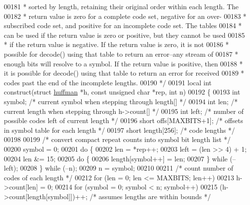 \begin{DoxyCode}
00181 \textcolor{comment}{ * sorted by length, retaining their original order within each length.  The}
00182 \textcolor{comment}{ * return value is zero for a complete code set, negative for an over-}
00183 \textcolor{comment}{ * subscribed code set, and positive for an incomplete code set.  The tables}
00184 \textcolor{comment}{ * can be used if the return value is zero or positive, but they cannot be used}
00185 \textcolor{comment}{ * if the return value is negative.  If the return value is zero, it is not}
00186 \textcolor{comment}{ * possible for decode() using that table to return an error--any stream of}
00187 \textcolor{comment}{ * enough bits will resolve to a symbol.  If the return value is positive, then}
00188 \textcolor{comment}{ * it is possible for decode() using that table to return an error for received}
00189 \textcolor{comment}{ * codes past the end of the incomplete lengths.}
00190 \textcolor{comment}{ */}
00191 local \textcolor{keywordtype}{int} construct(\textcolor{keyword}{struct} \hyperlink{structhuffman}{huffman} *h, \textcolor{keyword}{const} \textcolor{keywordtype}{unsigned} \textcolor{keywordtype}{char} *rep, \textcolor{keywordtype}{int} n)
00192 \{
00193     \textcolor{keywordtype}{int} symbol;         \textcolor{comment}{/* current symbol when stepping through length[] */}
00194     \textcolor{keywordtype}{int} len;            \textcolor{comment}{/* current length when stepping through h->count[] */}
00195     \textcolor{keywordtype}{int} left;           \textcolor{comment}{/* number of possible codes left of current length */}
00196     \textcolor{keywordtype}{short} offs[MAXBITS+1];      \textcolor{comment}{/* offsets in symbol table for each length */}
00197     \textcolor{keywordtype}{short} length[256];  \textcolor{comment}{/* code lengths */}
00198 
00199     \textcolor{comment}{/* convert compact repeat counts into symbol bit length list */}
00200     symbol = 0;
00201     \textcolor{keywordflow}{do} \{
00202         len = *rep++;
00203         left = (len >> 4) + 1;
00204         len &= 15;
00205         \textcolor{keywordflow}{do} \{
00206             length[symbol++] = len;
00207         \} \textcolor{keywordflow}{while} (--left);
00208     \} \textcolor{keywordflow}{while} (--n);
00209     n = symbol;
00210 
00211     \textcolor{comment}{/* count number of codes of each length */}
00212     \textcolor{keywordflow}{for} (len = 0; len <= MAXBITS; len++)
00213         h->count[len] = 0;
00214     for (symbol = 0; symbol < n; symbol++)
00215         (h->count[length[symbol]])++;   \textcolor{comment}{/* assumes lengths are within bounds */}

\end{DoxyCode}
